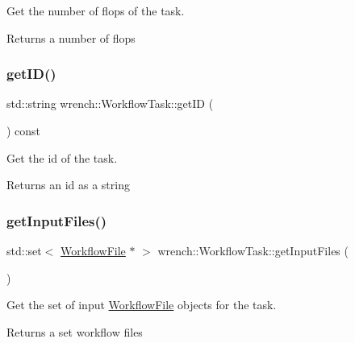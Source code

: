 Get the number of flops of the task. 

\begin{DoxyReturn}{Returns}
a number of flops 
\end{DoxyReturn}
\mbox{\label{classwrench_1_1_workflow_task_a18ce8967b4b59d2d231a1218a8d3b813}} 
\subsubsection{\texorpdfstring{get\+I\+D()}{getID()}}
{\footnotesize\ttfamily std\+::string wrench\+::\+Workflow\+Task\+::get\+ID (\begin{DoxyParamCaption}{ }\end{DoxyParamCaption}) const}



Get the id of the task. 

\begin{DoxyReturn}{Returns}
an id as a string 
\end{DoxyReturn}
\mbox{\label{classwrench_1_1_workflow_task_a1baf5564a8a03ec475b42064e1940eaa}} 
\subsubsection{\texorpdfstring{get\+Input\+Files()}{getInputFiles()}}
{\footnotesize\ttfamily std\+::set$<$ \hyperlink{classwrench_1_1_workflow_file}{Workflow\+File} $\ast$ $>$ wrench\+::\+Workflow\+Task\+::get\+Input\+Files (\begin{DoxyParamCaption}{ }\end{DoxyParamCaption})}



Get the set of input \hyperlink{classwrench_1_1_workflow_file}{Workflow\+File} objects for the task. 

\begin{DoxyReturn}{Returns}
a set workflow files 
\end{DoxyReturn}
\mbox{\label{classwrench_1_1_workflow_task_aa49cf3afae40d6dcf7394cd94fd4918f}} 
